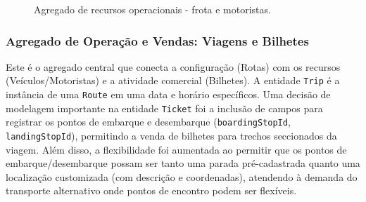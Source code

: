 \begin{figure}[H]
  \caption{Agregado de recursos operacionais - frota e motoristas.}
\end{figure}

\subsubsection*{Agregado de Operação e Vendas: Viagens e Bilhetes}

Este é o agregado central que conecta a configuração (Rotas) com os recursos (Veículos/Motoristas) e a atividade comercial (Bilhetes). A entidade \texttt{Trip} é a instância de uma \texttt{Route} em uma data e horário específicos. Uma decisão de modelagem importante na entidade \texttt{Ticket} foi a inclusão de campos para registrar os pontos de embarque e desembarque (\texttt{boardingStopId}, \texttt{landingStopId}), permitindo a venda de bilhetes para trechos seccionados da viagem. Além disso, a flexibilidade foi aumentada ao permitir que os pontos de embarque/desembarque possam ser tanto uma parada pré-cadastrada quanto uma localização customizada (com descrição e coordenadas), atendendo à demanda do transporte alternativo onde pontos de encontro podem ser flexíveis.

